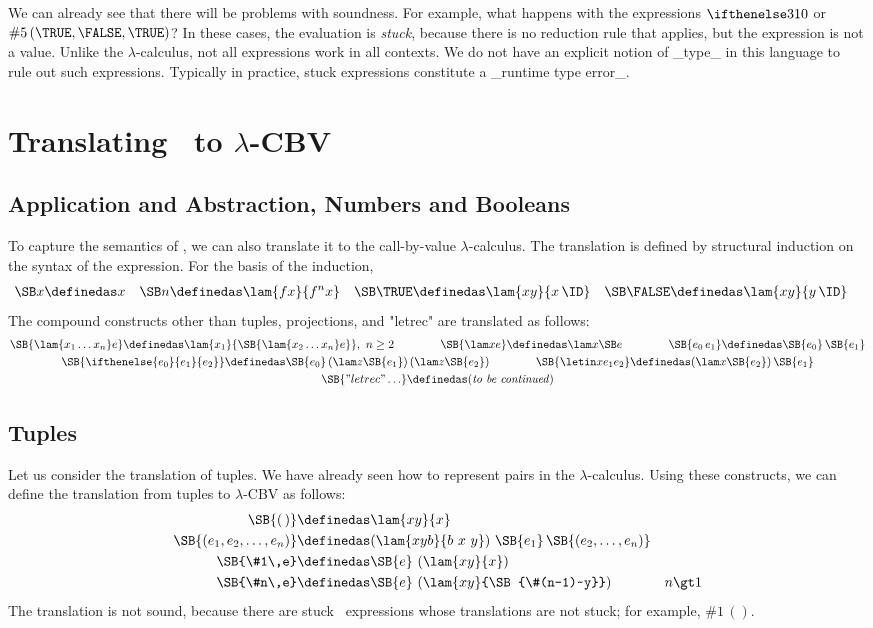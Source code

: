 We can already see that there will be problems with
soundness. For example, what happens with the expressions $\ifthenelse
310$ or $\#5\,(\TRUE,\FALSE,\TRUE)$? In these cases, the evaluation is \emph{stuck}, because there is no reduction rule that
applies, but the expression is not a value.
Unlike the $\lambda$-calculus, not all expressions work
in all contexts. We do not have an explicit notion of _type_ in this
language to rule out such expressions.
Typically in practice, stuck expressions constitute a _runtime type error_.

\section{Translating \FL\ to $\lambda$-CBV}

\subsection{Application and Abstraction, Numbers and Booleans}
 
To capture the semantics of \FL, we can also translate it to the
call-by-value $\lambda$-calculus.
The translation is defined by structural induction on the syntax of the expression.
For the basis of the induction, 
\begin{align*}
\SB x &\definedas x &
\SB n &\definedas \lam{fx}{f^n x} &
\SB\TRUE &\definedas \lam{xy}{x\,\ID} &
\SB\FALSE &\definedas \lam{xy}{y\,\ID}
\end{align*}
The compound constructs other than tuples, projections, and "letrec" are translated as follows:
\begin{gather*}
\SB{\lam{x_1\ldots x_n}e} \definedas \lam{x_1}{\SB{\lam{x_2\ldots x_n}e}},\ n\geq 2 \qquad\qquad
\SB{\lam xe} \definedas \lam x{\SB e} \qquad\qquad
\SB{e_0\,e_1} \definedas \SB{e_0}\,\SB{e_1}\\
\SB{\ifthenelse{e_0}{e_1}{e_2}} \definedas \SB{e_0}\,(\lam z{\SB{e_1}})\,(\lam z{\SB{e_2}}) \qquad\qquad
\SB{\letin x{e_1}{e_2}} \definedas (\lam x{\SB{e_2}})\,\SB{e_1}\\
\SB{"letrec" \ldots} \definedas \mbox{(\textit{to be continued})}
\end{gather*}

\subsection{Tuples}

Let us consider the translation of tuples. We have already seen how to
represent pairs in the $\lambda$-calculus. Using these constructs, we
can define the translation from tuples to $\lambda$-CBV as follows:
\begin{align*}
\SB{(\,)} & \definedas \lam{xy}{x} \\
\SB{(e_1,e_2,\ldots,e_n)} & \definedas (\lam{xyb}{b~x~y})~\SB{e_1}\,\SB{(e_2,\ldots,e_n)} \\
\SB{\#1\,e} & \definedas \SB{e}~(\lam{xy}{x}) \\
\SB{\#n\,e} & \definedas \SB{e}~(\lam{xy}{\SB{\#(n-1)~y}}) & n \gt 1
\end{align*}
The translation is not sound, because there are stuck \FL\ expressions whose translations are not stuck; for example, $\#1\,()$.

